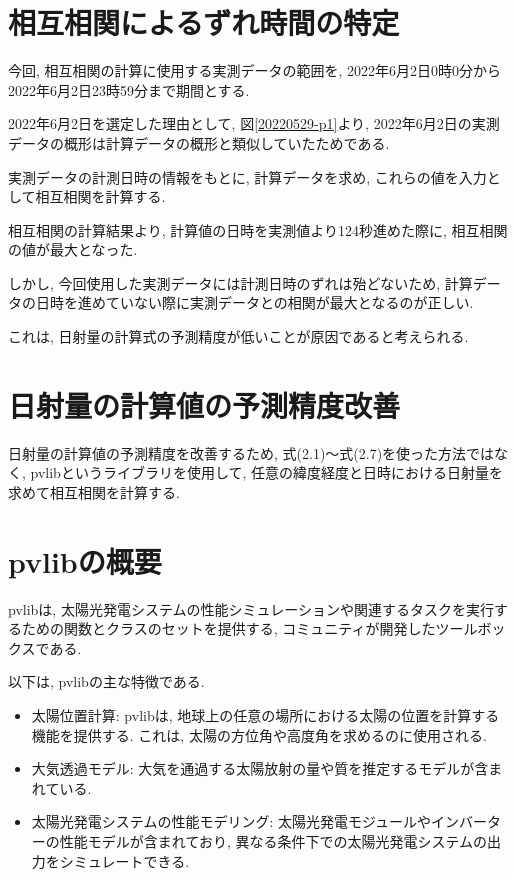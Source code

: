 
\section{相互相関によるずれ時間の特定}
今回, 相互相関の計算に使用する実測データの範囲を, 2022年6月2日0時0分から2022年6月2日23時59分まで期間とする.

2022年6月2日を選定した理由として, 図\ref{20220529-p1}より, 2022年6月2日の実測データの概形は計算データの概形と類似していたためである.

実測データの計測日時の情報をもとに, 計算データを求め, これらの値を入力として相互相関を計算する.

相互相関の計算結果より, 計算値の日時を実測値より124秒進めた際に, 相互相関の値が最大となった.

しかし, 今回使用した実測データには計測日時のずれは殆どないため, 計算データの日時を進めていない際に実測データとの相関が最大となるのが正しい.

これは, 日射量の計算式の予測精度が低いことが原因であると考えられる.

\section{日射量の計算値の予測精度改善}

日射量の計算値の予測精度を改善するため, 式(2.1)～式(2.7)を使った方法ではなく, pvlibというライブラリを使用して, 任意の緯度経度と日時における日射量を求めて相互相関を計算する.

\section{pvlibの概要}
pvlibは, 太陽光発電システムの性能シミュレーションや関連するタスクを実行するための関数とクラスのセットを提供する, コミュニティが開発したツールボックスである. 

以下は, pvlibの主な特徴である.

\begin{itemize}
  \item 太陽位置計算: pvlibは, 地球上の任意の場所における太陽の位置を計算する機能を提供する. これは, 太陽の方位角や高度角を求めるのに使用される. 
  \item 大気透過モデル: 大気を通過する太陽放射の量や質を推定するモデルが含まれている. 
  \item 太陽光発電システムの性能モデリング: 太陽光発電モジュールやインバーターの性能モデルが含まれており, 異なる条件下での太陽光発電システムの出力をシミュレートできる. 
\end{itemize}

